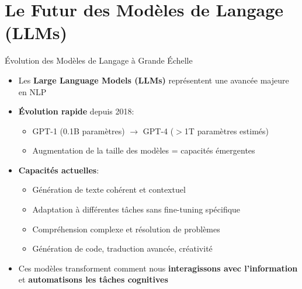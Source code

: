 \documentclass[aspectratio=169,11pt]{beamer}
\begin{document}
\section{Le Futur des Modèles de Langage (LLMs)}

\begin{frame}{Évolution des Modèles de Langage à Grande Échelle}
    \begin{itemize}
        \item Les \textbf{Large Language Models (LLMs)} représentent une avancée majeure en NLP
        \item \textbf{Évolution rapide} depuis 2018:
        \begin{itemize}
            \item GPT-1 (0.1B paramètres) $\rightarrow$ GPT-4 ($>$1T paramètres estimés)
            \item Augmentation de la taille des modèles = capacités émergentes
        \end{itemize}
        \item \textbf{Capacités actuelles}:
        \begin{itemize}
            \item Génération de texte cohérent et contextuel
            \item Adaptation à différentes tâches sans fine-tuning spécifique
            \item Compréhension complexe et résolution de problèmes
            \item Génération de code, traduction avancée, créativité
        \end{itemize}
        \item Ces modèles transforment comment nous \textbf{interagissons avec l'information} et \textbf{automatisons les tâches cognitives}
    \end{itemize}
\end{frame}
\end{document}
